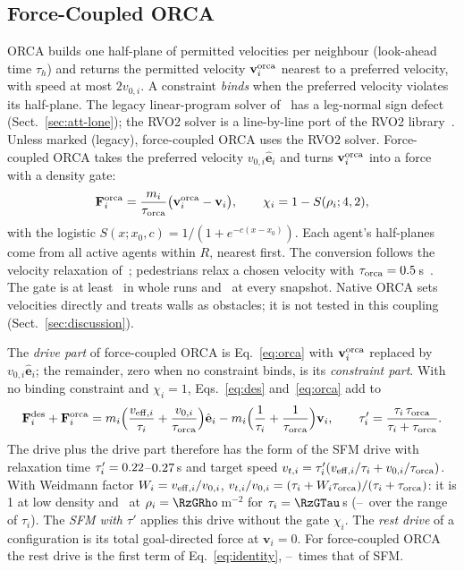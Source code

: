 \subsection{Force-Coupled ORCA}\label{sec:identity}
ORCA builds one half-plane of permitted velocities per neighbour (look-ahead time $\tau_h$) and returns the permitted velocity $\mathbf v^{\rm orca}_i$ nearest to a preferred velocity, with speed at most $2v_{0,i}$. A constraint \emph{binds} when the preferred velocity violates its half-plane. The legacy linear-program solver of~\cite{gang2026} has a leg-normal sign defect (Sect.~\ref{sec:att-lone}); the RVO2 solver is a line-by-line port of the RVO2 library~\cite{vandenberg2011rvo2}. Unless marked (legacy), force-coupled ORCA uses the RVO2 solver. Force-coupled ORCA takes the preferred velocity $v_{0,i}\hat{\mathbf e}_i$ and turns $\mathbf v^{\rm orca}_i$ into a force with a density gate:
\begin{equation}\label{eq:orca}
\mathbf F^{\rm orca}_i=\frac{m_i}{\tau_{\rm orca}}\bigl(\mathbf v^{\rm orca}_i-\mathbf v_i\bigr),\qquad \chi_i=1-S(\rho_i;4,2),
\end{equation}
with the logistic $S(x;x_0,c)=1/(1+e^{-c(x-x_0)})$. Each agent's half-planes come from all active agents within $R$, nearest first. The conversion follows the velocity relaxation of~\cite[Eq.~(7)]{vandenberg2011avo}; pedestrians relax a chosen velocity with $\tau_{\rm orca}=0.5$\,s~\cite{moussaid2011}. The gate is at least \PmodRunsWMinTwo\ in whole runs and \PmodLoneWMinTwo\ at every snapshot. Native ORCA sets velocities directly and treats walls as obstacles; it is not tested in this coupling (Sect.~\ref{sec:discussion}).

The \emph{drive part} of force-coupled ORCA is Eq.~\eqref{eq:orca} with $\mathbf v^{\rm orca}_i$ replaced by $v_{0,i}\hat{\mathbf e}_i$; the remainder, zero when no constraint binds, is its \emph{constraint part}. With no binding constraint and $\chi_i=1$, Eqs.~\eqref{eq:des} and~\eqref{eq:orca} add to
\begin{equation}\label{eq:identity}
\mathbf F^{\rm des}_i+\mathbf F^{\rm orca}_i=m_i\Bigl(\frac{v_{{\rm eff},i}}{\tau_i}+\frac{v_{0,i}}{\tau_{\rm orca}}\Bigr)\hat{\mathbf e}_i-m_i\Bigl(\frac{1}{\tau_i}+\frac{1}{\tau_{\rm orca}}\Bigr)\mathbf v_i,\qquad
\tau'_i=\frac{\tau_i\,\tau_{\rm orca}}{\tau_i+\tau_{\rm orca}}.
\end{equation}
The drive plus the drive part therefore has the form of the SFM drive with relaxation time $\tau'_i=0.22$--$0.27$\,s and target speed $v_{t,i}=\tau'_i(v_{{\rm eff},i}/\tau_i+v_{0,i}/\tau_{\rm orca})$. With Weidmann factor $W_i=v_{{\rm eff},i}/v_{0,i}$, $v_{t,i}/v_{0,i}=(\tau_i+W_i\tau_{\rm orca})/(\tau_i+\tau_{\rm orca})$: it is 1 at low density and \RzGRatio\ at $\rho_i=\RzGRho$\,m$^{-2}$ for $\tau_i=\RzGTau$\,s (\RzGRatioLo--\RzGRatioHi\ over the range of $\tau_i$). The \emph{SFM with $\tau'$} applies this drive without the gate $\chi_i$. The \emph{rest drive} of a configuration is its total goal-directed force at $\mathbf v_i=0$. For force-coupled ORCA the rest drive is the first term of Eq.~\eqref{eq:identity}, \RevAoneDriveRatioLo--\RevAoneDriveRatioHi\ times that of SFM.

